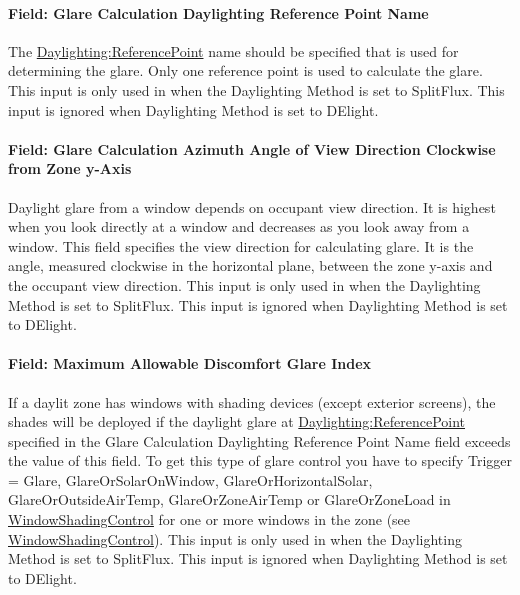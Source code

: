 \paragraph{Field: Glare Calculation Daylighting Reference Point Name}\label{field-glare-calculation-daylighting-reference-point-name}

The \hyperref[daylightingreferencepoint-000]{Daylighting:ReferencePoint} name should be specified that is used for determining the glare. Only one reference point is used to calculate the glare. This input is only used in when the Daylighting Method is set to SplitFlux. This input is ignored when Daylighting Method is set to DElight.

\paragraph{Field: Glare Calculation Azimuth Angle of View Direction Clockwise from Zone y-Axis}\label{field-glare-calculation-azimuth-angle-of-view-direction-clockwise-from-zone-y-axis}

Daylight glare from a window depends on occupant view direction. It is highest when you look directly at a window and decreases as you look away from a window. This field specifies the view direction for calculating glare. It is the angle, measured clockwise in the horizontal plane, between the zone y-axis and the occupant view direction. This input is only used in when the Daylighting Method is set to SplitFlux. This input is ignored when Daylighting Method is set to DElight.

\paragraph{Field: Maximum Allowable Discomfort Glare Index}\label{field-maximum-allowable-discomfort-glare-index}

If a daylit zone has windows with shading devices (except exterior screens), the shades will be deployed if the daylight glare at \hyperref[daylightingreferencepoint-000]{Daylighting:ReferencePoint} specified in the Glare Calculation Daylighting Reference Point Name field exceeds the value of this field. To get this type of glare control you have to specify Trigger = Glare, GlareOrSolarOnWindow, GlareOrHorizontalSolar, GlareOrOutsideAirTemp, GlareOrZoneAirTemp or GlareOrZoneLoad in \hyperref[windowpropertyshadingcontrol]{WindowShadingControl} for one or more windows in the zone (see \hyperref[windowpropertyshadingcontrol]{WindowShadingControl}). This input is only used in when the Daylighting Method is set to SplitFlux. This input is ignored when Daylighting Method is set to DElight.

